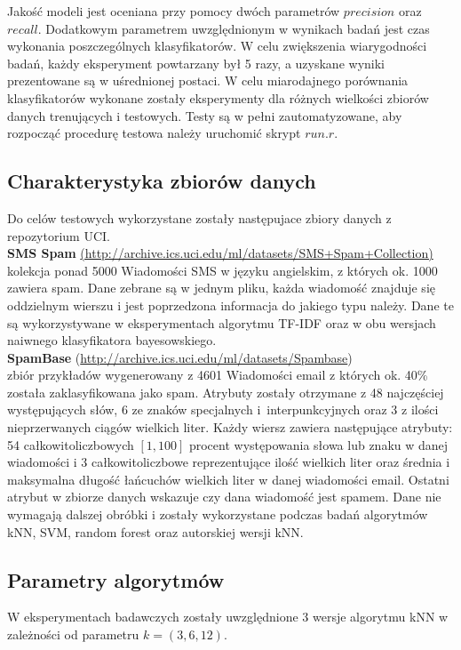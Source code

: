 \documentclass[a4paper, 10pt]{article}
\begin{document}
Jakość modeli jest oceniana przy pomocy dwóch parametrów $precision$ oraz $recall$. Dodatkowym 
parametrem uwzględnionym w wynikach badań jest czas wykonania poszczególnych klasyfikatorów. 
W celu zwiększenia wiarygodności badań, każdy eksperyment powtarzany był 5 razy, a uzyskane wyniki prezentowane 
są w uśrednionej postaci. W celu miarodajnego porównania klasyfikatorów wykonane zostały eksperymenty dla różnych wielkości 
zbiorów danych trenujących i testowych. Testy są w pełni zautomatyzowane, aby rozpocząć procedurę testowa należy uruchomić skrypt 
$run.r$.






	\subsection{Charakterystyka zbiorów danych}
	
Do celów testowych wykorzystane zostały następujace zbiory danych z repozytorium UCI.\\

\textbf{SMS Spam} \url{(http://archive.ics.uci.edu/ml/datasets/SMS+Spam+Collection)} \\ kolekcja ponad 5000 Wiadomości SMS w języku angielskim, z których ok. 1000 zawiera spam. Dane zebrane są w jednym pliku, każda wiadomość znajduje się oddzielnym wierszu i 
jest poprzedzona informacja do jakiego typu należy. Dane te są wykorzystywane w eksperymentach algorytmu TF-IDF oraz w obu wersjach naiwnego klasyfikatora bayesowskiego. \\

\textbf{SpamBase} (\url{http://archive.ics.uci.edu/ml/datasets/Spambase}) \\ zbiór przykładów wygenerowany z 4601 Wiadomości email z których ok. 40\% została zaklasyfikowana jako spam. Atrybuty zostały otrzymane z 48 najczęściej występujących słów, 
6 ze znaków specjalnych i~interpunkcyjnych oraz 3 z ilości nieprzerwanych ciągów wielkich liter.  Każdy wiersz zawiera następujące atrybuty: 54 całkowitoliczbowych $[1,100]$ procent występowania słowa lub znaku w danej wiadomości 
i 3 całkowitoliczbowe reprezentujące ilość wielkich liter oraz średnia i maksymalna długość łańcuchów wielkich liter w danej wiadomości email. Ostatni atrybut w zbiorze danych wskazuje czy dana wiadomość jest spamem. 
Dane nie wymagają dalszej obróbki i zostały wykorzystane podczas badań 	algorytmów kNN, SVM, random forest oraz autorskiej wersji kNN.
	
	
	\subsection{Parametry algorytmów}
W eksperymentach badawczych zostały uwzględnione 3 wersje algorytmu kNN w zależności od parametru $k=(3,6,12)$.
\end{document}
